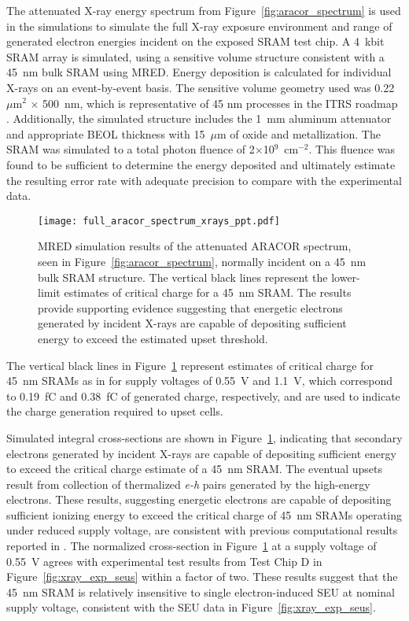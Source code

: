 The attenuated X-ray energy spectrum from Figure~\ref{fig:aracor_spectrum} is used in the simulations to simulate the full X-ray exposure environment and range of generated electron energies incident on the exposed SRAM test chip. 
A 4~kbit SRAM array is simulated, using a sensitive volume structure consistent with a 45~nm bulk SRAM using MRED.
Energy deposition is calculated for individual X-rays on an event-by-event basis.
The sensitive volume geometry used was 0.22~$\mu$m$^2$ $\times$ 500~nm, which is representative of 45 nm processes in the ITRS roadmap \cite{itrs:2012}. 
Additionally, the simulated structure includes the 1~mm aluminum attenuator and appropriate BEOL thickness with 15~$\mu$m of oxide and metallization. 
The SRAM was simulated to a total photon fluence of 2$\times$10$^9$~cm$^{-2}$.
This fluence was found to be sufficient to determine the energy deposited and ultimately estimate the resulting error rate with adequate precision to compare with the experimental data. 
\begin{figure}[tb]
   \centering
       \texttt{[image: full\_aracor\_spectrum\_xrays\_ppt.pdf]}
   \caption{MRED simulation results of the attenuated ARACOR spectrum, seen in Figure~\ref{fig:aracor_spectrum}, normally incident on a 45~nm bulk SRAM structure. The vertical black lines represent the lower-limit estimates of critical charge for a 45~nm SRAM. The results provide supporting evidence suggesting that energetic electrons generated by incident X-rays are capable of depositing sufficient energy to exceed the estimated upset threshold.}
   \label{fig:50kev_xrays_ppt}
\end{figure}
The vertical black lines in Figure~\ref{fig:50kev_xrays_ppt} represent estimates of critical charge for 45~nm SRAMs as in \cite{King:2010cu} for supply voltages of 0.55~V and 1.1~V, which correspond to 0.19~fC and 0.38~fC of generated charge, respectively, and are used to indicate the charge generation required to upset cells.

Simulated integral cross-sections are shown in Figure~\ref{fig:50kev_xrays_ppt}, indicating that secondary electrons generated by incident X-rays are capable of depositing sufficient energy to exceed the critical charge estimate of a 45~nm SRAM. 
The eventual upsets result from collection of thermalized \emph{e-h} pairs generated by the high-energy electrons. 
These results, suggesting energetic electrons are capable of depositing sufficient ionizing energy to exceed the critical charge of 45~nm SRAMs operating under reduced supply voltage, are consistent with previous computational results reported in \cite{King:2010cu, King:2012cb}. 
The normalized cross-section in Figure~\ref{fig:50kev_xrays_ppt} at a supply voltage of 0.55~V agrees with experimental test results from Test Chip D in Figure~\ref{fig:xray_exp_seus} within a factor of two. 
These results suggest that the 45~nm SRAM is relatively insensitive to single electron-induced SEU at nominal supply voltage, consistent with the SEU data in Figure~\ref{fig:xray_exp_seus}. 

